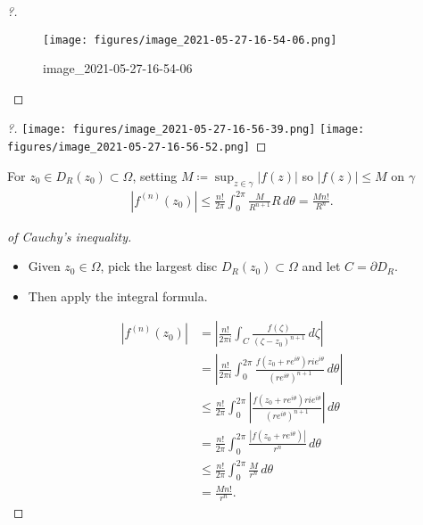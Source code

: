 \begin{proof}[?]

\begin{figure}
\centering
\texttt{[image: figures/image\_2021-05-27-16-54-06.png]}
\caption{image\_2021-05-27-16-54-06}
\end{figure}

\end{proof}

\begin{proof}[?]

\texttt{[image: figures/image\_2021-05-27-16-56-39.png]}
\texttt{[image: figures/image\_2021-05-27-16-56-52.png]}

\end{proof}

\begin{theorem}\label{CauchyInequality}

For \(z_0 \in D_R(z_0) \subset \Omega\), setting
\(M \coloneqq\sup_{z\in \gamma}{\left\lvert {f(z)} \right\rvert}\) so
\({\left\lvert {f(z)} \right\rvert}\leq M\) on \(\gamma\)
\begin{align*}
{\left\lvert { f^{(n)} (z_0) } \right\rvert} 
\leq \frac{n !}{2 \pi} \int_{0}^{2 \pi} \frac{ M } {R^{n+1}} R \,d\theta
= \frac{M n ! }{R^n} 
.\end{align*}

\end{theorem}

\begin{proof}[of Cauchy's inequality]

\envlist

\begin{itemize}
\tightlist
\item
  Given \(z_0\in \Omega\), pick the largest disc
  \(D_R(z_0) \subset \Omega\) and let \(C = {{\partial}}D_R\).
\item
  Then apply the integral formula.
\end{itemize}

\begin{align*}
\left|f^{(n)}(z_0)\right|
&= {\left\lvert { \frac{n !}{2 \pi i} \int_{C} \frac{f(\zeta) }{(\zeta-z_0)^{n+1}} \,d\zeta} \right\rvert} \\
&=\left|\frac{n !}{2 \pi i} \int_{0}^{2 \pi} \frac{f\left(z_0 + r e^{i \theta}\right) r i e^{i \theta} }{\left(r e^{i \theta}\right)^{n+1}} \,d\theta\right| \\
&\leq \frac{n !}{2 \pi} \int_{0}^{2 \pi}\left|\frac{f\left( z_0 +r e^{i \theta}\right) r i e^{i \theta}}{\left(r e^{i \theta}\right)^{n+1}}\right| \,d\theta\\ 
&=\frac{n !}{2 \pi} \int_{0}^{2 \pi} \frac{\left|f\left(z_0 +r e^{i \theta}\right)\right|}{r^{n}} \,d\theta\\
&\leq \frac{n !}{2 \pi} \int_{0}^{2 \pi} \frac{M}{r^{n}} \,d\theta\\
&=\frac{M n !}{r^{n}} 
.\end{align*}

\end{proof}

